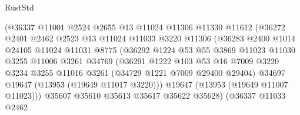 \begin{lexlean}{RustStd}
\begin{coremodule}
                            (@36337
                              @11001
                              @2524
                              @2655
                              @13
                              @11024
                              @11306
                              @11330
                              @11612
                              (@36272
                                @2401
                                @2462
                                @2523
                                @13
                                @11024
                                @11033
                                @3220
                                @11306
                                (@36283
                                  @2400
                                  @1014
                                  @24105
                                  @11024
                                  @11031
                                  @8775
                                  (@36292
                                    @1224
                                    @53
                                    @55
                                    @3869
                                    @11023
                                    @11030
                                    @3255
                                    @11006
                                    @3261
                                    @34769
                                    (@36291
                                      @1222
                                      @103
                                      @53
                                      @16
                                      @7009
                                      @3220
                                      @3234
                                      @3255
                                      @11016
                                      @3261
                                      (@34729 @1221 @7009 @29400 @29404)
                                      @34697
                                      @19647
                                      (@13953 (@19649 @11017 @3220)))
                                    @19647
                                    (@13953 (@19649 @11007 @11023)))
                                  @35607
                                  @35610
                                  @35613
                                  @35617
                                  @35622
                                  @35628)
                                (@36337
                                  @11033
                                  @2462

\end{coremodule}
\end{lexlean}

